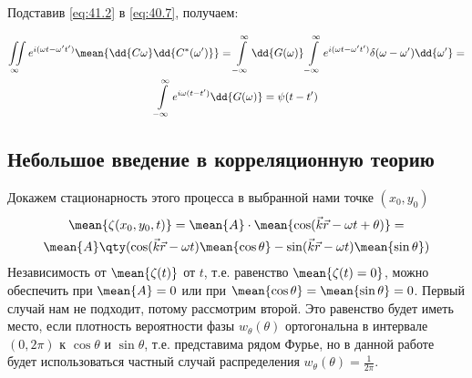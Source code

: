Подставив \eqref{eq:41.2}  в \eqref{eq:40.7}, получаем:

\begin{gather}
	\iint\limits_{\infty} e^{i(\omega t - \omega't')} \mean{\dd{C{\omega}}\dd{C^*(\omega')}}= 
	\int\limits_{-\infty}^{\infty}\dd{G(\omega)}
	\int\limits_{-\infty}^{\infty} e^{i(\omega t - \omega't')} \delta(\omega-\omega')\dd{\omega'}=\\
	 \int\limits_{-\infty}^{\infty} e^{i \omega (t-t')} \dd{G(\omega)}=\psi(t-t')
\end{gather}



\subsection{Небольшое введение в корреляционную теорию}
Докажем стационарность этого процесса в выбранной нами точке $(x_0,y_0)$
\begin{gather}
	\mean { \zeta(x_0,y_0,t) } = 
	\mean{A}\cdot \mean{\cos(\vec k \vec r -\omega t +\theta)} = \\
	\mean{A} \qty( \cos(\vec k \vec r -\omega t) \mean{\cos\theta}
		- \sin(\vec k \vec r -\omega t)\mean{\sin{\theta}} )
\end{gather}
Независимость от $\mean{\zeta(t)}$ от $t$, т.е. равенство $\mean{\zeta (t)=0}$, можно обеспечить при  $\mean {A}=0$ или при $\mean{\cos\theta}=\mean{\sin\theta}=0$. Первый случай нам не подходит, потому рассмотрим второй. Это равенство будет иметь место, если плотность вероятности фазы $w_{\theta}(\theta)$ ортогональна в интервале $(0, 2\pi)$
к $\cos\theta$ и $\sin\theta$, т.е. представима рядом Фурье, но в данной работе будет использоваться частный случай распределения $w_{\theta}(\theta)=\frac{1}{2\pi}$.

